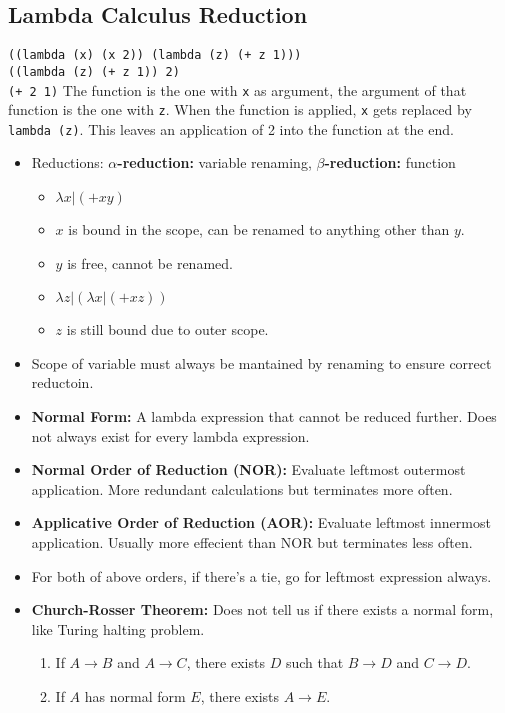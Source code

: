 \documentclass[landscape, letterpaper]{extarticle}
\theoremstyle{definition}
\begin{document}
\begin{multicols}{3}
    \subsection*{Lambda Calculus Reduction}
    \verb|((lambda (x) (x 2)) (lambda (z) (+ z 1)))|\\
    \verb|((lambda (z) (+ z 1)) 2)|\\
    \verb|(+ 2 1)|
    The function is the one with \verb|x| as argument, the argument of that function is the one with \verb|z|. When the function is applied, \verb|x| gets replaced by \verb|lambda (z)|. This leaves an application of 2 into the function at the end.
    \begin{itemize}[noitemsep,nolistsep]
        \item Reductions: \textbf{\(\alpha\)-reduction:} variable renaming, \textbf{\(\beta\)-reduction:} function
              \begin{itemize}[noitemsep,nolistsep]
                  \item \(\lambda x | (+ x y)\)
                  \item \(x\) is bound in the scope, can be renamed to anything other than \(y\).
                  \item \(y\) is free, cannot be renamed.
                  \item \(\lambda z | (\lambda x | (+ x z))\)
                  \item \(z\) is still bound due to outer scope.
              \end{itemize}
        \item Scope of variable must always be mantained by renaming to ensure correct reductoin.
        \item \textbf{Normal Form: } A lambda expression that cannot be reduced further. Does not always exist for every lambda expression.
        \item \textbf{Normal Order of Reduction (NOR): } Evaluate leftmost outermost application. More redundant calculations but terminates more often.
        \item \textbf{Applicative Order of Reduction (AOR): } Evaluate leftmost innermost application. Usually more effecient than NOR but terminates less often.
        \item For both of above orders, if there's a tie, go for leftmost expression always.
        \item \textbf{Church-Rosser Theorem: } Does not tell us if there exists a normal form, like Turing halting problem.
              \begin{enumerate}
                  \item If \(A \rightarrow B\) and \(A \rightarrow C\), there exists \(D\) such that \(B \rightarrow D\) and \(C \rightarrow D\).
                  \item If \(A\) has normal form \(E\), there exists \(A \rightarrow E\).
              \end{enumerate}
    \end{itemize}

\end{multicols}
\end{document}
